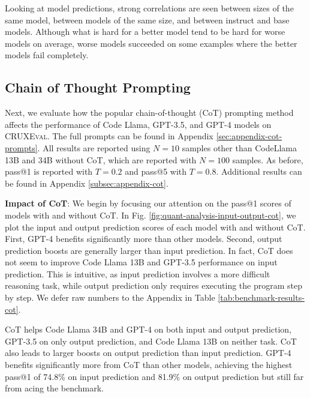 \documentclass{article}
\newcommand{\benchmark}{\textsc{CRUXEval}\xspace}
\begin{document}
\begin{tcolorbox}[colback=lightgreen, boxrule=0pt, arc=10pt, outer arc=10pt]
Looking at model predictions, strong correlations are seen between sizes of the same model, between models of the same size, and between instruct and base models. Although what is hard for a better model tend to be hard for worse models on average, worse models succeeded on some examples where the better models fail completely.
\end{tcolorbox}

\subsection{Chain of Thought Prompting} \label{subsec:cot}
Next, we evaluate how the popular chain-of-thought (CoT) prompting method \citep{wei2022chain} affects the performance of Code Llama, GPT-3.5, and GPT-4 models on \benchmark. The full prompts can be found in Appendix \ref{sec:appendix-cot-prompts}. All results are reported using $N=10$ samples other than CodeLlama 13B and 34B without CoT, which are reported with $N=100$ samples. As before, pass@1 is reported with $T=0.2$ and pass@5 with $T=0.8$. Additional results can be found in Appendix \ref{subsec:appendix-cot}.

\textbf{Impact of CoT}: We begin by focusing our attention on the pass@1 scores of models with and without CoT. In Fig. \ref{fig:quant-analysis-input-output-cot}, we plot the input and output prediction scores of each model with and without CoT. First, GPT-4 benefits significantly more than other models. Second, output prediction boosts are generally larger than input prediction. In fact, CoT does not seem to improve Code Llama 13B and GPT-3.5 performance on input prediction. This is intuitive, as input prediction involves a more difficult reasoning task, while output prediction only requires executing the program step by step. We defer raw numbers to the Appendix in Table \ref{tab:benchmark-results-cot}.

\begin{tcolorbox}[colback=lightgreen, boxrule=0pt, arc=10pt, outer arc=10pt]
CoT helps Code Llama 34B and GPT-4 on both input and output prediction, GPT-3.5 on only output prediction, and Code Llama 13B on neither task. CoT also leads to larger boosts on output prediction than input prediction. GPT-4 benefits significantly more from CoT than other models, achieving the highest pass@1 of 74.8\% on input prediction and 81.9\% on output prediction but still far from acing the benchmark.
\end{tcolorbox}
\end{document}
